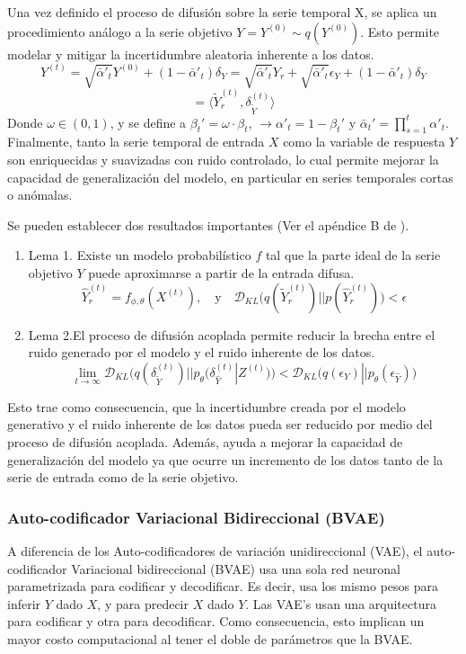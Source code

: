 \documentclass[12pt,letterpaper]{article}
\begin{document}
Una vez definido el proceso de difusión sobre la serie temporal X, se aplica un procedimiento análogo a la serie objetivo $Y=Y^{(0)}\sim q(Y^{(0)})$. Esto permite modelar y mitigar la incertidumbre aleatoria inherente a los datos. 
\begin{equation}
    Y^{(t)} = \sqrt{\bar{\alpha}'_t}Y^{(0)}+(1-\bar{\alpha}'_t)\delta_Y=\sqrt{\bar{\alpha}'_t}Y_r+\sqrt{\bar{\alpha}'_t}\epsilon_{Y}+(1-\bar{\alpha}'_t)\delta_Y
\end{equation}
\[ =\langle \tilde{Y}_r^{(t)}, \delta_{\tilde{Y}}^{(t)} \rangle\]
Donde $\omega \in(0,1)$, y se define a $\beta_t'=\omega\cdot\beta_t$, $\to \alpha'_t=1-\beta_t'$ y $\bar{\alpha}_t'=\prod_{s=1}^{t}\alpha'_t$. Finalmente, tanto la serie temporal de entrada $X$ como la variable de respuesta $Y$ son enriquecidas y suavizadas con ruido controlado, lo cual permite mejorar la capacidad de generalización del modelo, en particular en series temporales cortas o anómalas.

Se pueden establecer dos resultados importantes (Ver el apéndice B de \cite{li2022generative}).
\begin{enumerate}
    \item Lema 1. Existe un modelo probabilístico $f$ tal que la parte ideal de la serie objetivo $Y$ puede aproximarse a partir de la entrada difusa.
    \begin{equation}
    \hat{Y}_r^{(t)}=f_{\phi,\theta}(X^{(t)}), \quad \text{y} \quad \mathcal{D}_{KL}\big(q(\tilde{Y}_r^{(t)}) || p(\hat{Y}_r^{(t)})\big)<\epsilon
    \end{equation}
    \item Lema 2.El proceso de difusión acoplada permite reducir la brecha entre el ruido generado por el modelo y el ruido inherente de los datos.
    \begin{equation}
        \lim_{t\to \infty} \mathcal{D}_{KL}\big(q(\delta_{\tilde{Y}}^{(t)}) || p_\theta(\delta_{\hat{Y}}^{(t)} |Z^{(t)})\big)<  \mathcal{D}_{KL}\big( q(\epsilon_Y)|| p_\theta(\epsilon_{\hat{Y}}) \big) 
    \end{equation}
\end{enumerate}
Esto trae como consecuencia, que la incertidumbre creada por el modelo generativo y el ruido inherente de los datos pueda ser reducido por medio del proceso de difusión acoplada. Además, ayuda a mejorar la capacidad de generalización del modelo ya que ocurre un incremento de los datos tanto de la serie de entrada como de la serie objetivo. 

\subsubsection{Auto-codificador Variacional Bidireccional (BVAE)}
A diferencia de los Auto-codificadores de variación unidireccional (VAE), el auto-codificador Variacional bidireccional (BVAE) usa una sola red neuronal parametrizada para codificar y decodificar. Es decir, usa los mismo pesos para inferir $Y$ dado $X$, y para predecir $X$ dado $Y$. Las VAE's usan una arquitectura para codificar y otra para decodificar. Como consecuencia, esto implican un mayor costo computacional al tener el doble de parámetros que la BVAE.
\end{document}
